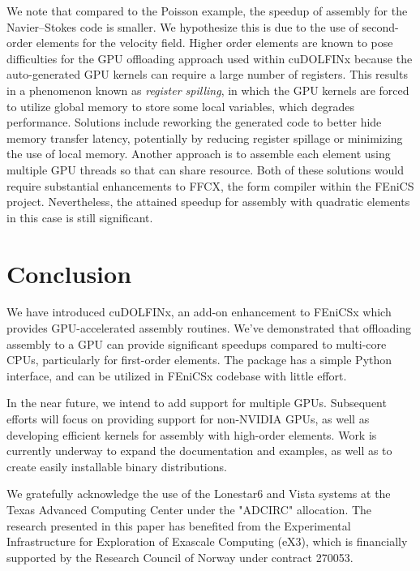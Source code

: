 We note that compared to the Poisson example, the speedup of assembly for the Navier--Stokes code is smaller. We hypothesize this is due to the use of second-order elements for the velocity field. Higher order elements are known to pose difficulties for the GPU offloading approach used within cuDOLFINx because the auto-generated GPU kernels can require a large number of registers. This results in a phenomenon known as \textit{register spilling}, in which the GPU kernels are forced to utilize global memory to store some local variables, which degrades performance. Solutions include reworking the generated code to better hide memory transfer latency, potentially by reducing register spillage or minimizing the use of local memory. Another approach is to assemble each element using multiple GPU threads so that can share resource. Both of these solutions would require substantial enhancements to FFCX, the form compiler within the FEniCS project. Nevertheless, the attained speedup for assembly with quadratic elements in this case is still significant.

\section*{Conclusion}
We have introduced cuDOLFINx, an add-on enhancement to FEniCSx which provides GPU-accelerated assembly routines. We've demonstrated that offloading assembly to a GPU can provide significant speedups compared to multi-core CPUs, particularly for first-order elements. The package has a simple Python interface, and can be utilized in FEniCSx codebase with little effort.

In the near future, we intend to add support for multiple GPUs. Subsequent efforts will focus on providing support for non-NVIDIA GPUs, as well as developing efficient kernels for assembly with high-order elements. Work is currently underway to expand the documentation and examples, as well as to create easily installable binary distributions.



\begin{acknowledgement}
  We gratefully acknowledge the use of the Lonestar6 and Vista systems at the Texas Advanced Computing Center under the "ADCIRC" allocation.
  The research presented in this paper has benefited from the Experimental Infrastructure for Exploration of Exascale Computing (eX3), which is financially supported by the Research Council of Norway under contract 270053.
\end{acknowledgement}



